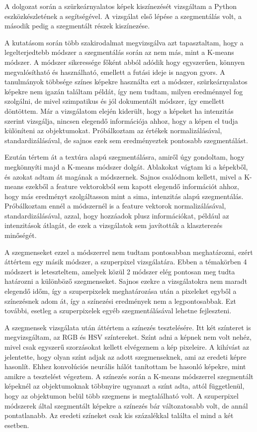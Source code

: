 
A dolgozat során a szürkeárnyalatos képek kiszínezését vizsgáltam a Python eszközkészletének a segítségével. A vizsgálat első lépése a szegmentálás volt, a második pedig a szegmentált részek kiszínezése.

A kutatásom során több szakirodalmat megvizsgálva azt tapasztaltam, hogy a legelterjedtebb módszer a szegmentálás során az nem más, mint a K-means módszer. A módszer sikeressége főként abból adódik hogy egyszerűen, könnyen megvalósítható és használható, emellett a futási ideje is nagyon gyors. A tanulmányok többsége színes képekre használta ezt a módszer, szürkeárnyalatos képekre nem igazán találtam példát, így nem tudtam, milyen eredménnyel fog szolgálni, de mivel szimpatikus és jól dokumentált módszer, így emellett döntöttem. Már a vizsgálatom elején kiderült, hogy a képeket ha intenzitás szerint vizsgálja, nincsen elegendő információja ahhoz, hogy a képen el tudja különíteni az objektumokat. Próbálkoztam az értékek normalizálásával, standardizálásával, de sajnos ezek sem eredményeztek pontosabb szegmentálást.

Ezután tértem át a textúra alapú szegmentálásra, amiről úgy gondoltam, hogy megkönnyíti majd a K-means módszer dolgát. Ablakokat vágtam ki a képekből, és azokat adtam át magának a módszernek. Sajnos csalódnom kellett, mivel a K-means ezekből a feature vektorokból sem kapott elegendő információt ahhoz, hogy más eredményt szolgáltasson mint a sima, intenzitás alapú szegmentálás. Próbálkoztam ennél a módszernél is a feature vektorok normalizálásával, standardizálásával, azzal, hogy hozzáadok plusz információkat, például az intenzitások átlagát, de ezek a vizsgálatok sem javították a klaszterezés minőségét.

A szegmenseket ezzel a módszerrel nem tudtam pontosabban meghatározni, ezért áttértem egy másik módszer, a szuperpixel vizsgálatára. Ebben a témakörben 4 módszert is leteszteltem, amelyek közül 2 módszer elég pontosan meg tudta határozni a különböző szegmenseket. Sajnos ezekre a vizsgálatokra nem maradt elegendő időm, így a szuperpixelek meghatározása után a pixeleket egyből a színezésnek adom át, így a színezési eredmények nem a legpontosabbak. Ezt további, esetleg a szuperpixelek egyéb szegmentálásával lehetne fejleszteni. 

A szegmensek vizsgálata után áttértem a színezés tesztelésére. Itt két színteret is megvizsgáltam, az RGB és HSV színtereket. Színt adni a képnek nem volt nehéz, mivel csak egyszerű szorzásokat kellett elvégeznem a kép pixeleire. A kihívást az jelentette, hogy olyan színt adjak az adott szegmenseknek, ami az eredeti képre hasonlít. Ehhez konvolúciós neurális hálót tanítottam be hasonló képekre, mint amikre a tesztelést végeztem. A színezés során a K-means módszerrel szegmentált képeknél az objektumoknak többnyire ugyanazt a színt adta, attól függetlenül, hogy az objektumon belül több szegmens is megtalálható volt. A szuperpixel módszerek által szegmentált képekre a színezés bár változatosabb volt, de annál pontatlanabb. Az eredeti színeket csak kis százalékkal találta el mind a két esetben.

